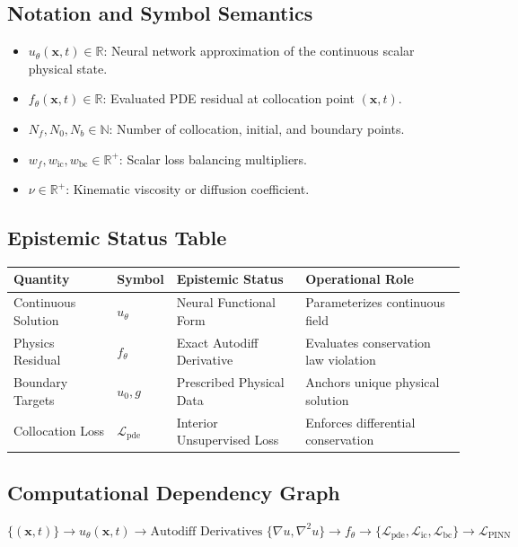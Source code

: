 \documentclass[11pt,a4paper]{article}
\theoremstyle{definition}
\begin{document}
\subsection{Notation and Symbol Semantics}
\begin{itemize}
    \item $u_\theta(\mathbf{x}, t) \in \mathbb{R}$: Neural network approximation of the continuous scalar physical state.
    \item $f_\theta(\mathbf{x}, t) \in \mathbb{R}$: Evaluated PDE residual at collocation point $(\mathbf{x}, t)$.
    \item $N_f, N_0, N_b \in \mathbb{N}$: Number of collocation, initial, and boundary points.
    \item $w_f, w_{\text{ic}}, w_{\text{bc}} \in \mathbb{R}^+$: Scalar loss balancing multipliers.
    \item $\nu \in \mathbb{R}^+$: Kinematic viscosity or diffusion coefficient.
\end{itemize}

\subsection{Epistemic Status Table}
\begin{table}[h]
\centering
\small
\begin{tabular}{@{}llll@{}}
\toprule
\textbf{Quantity} & \textbf{Symbol} & \textbf{Epistemic Status} & \textbf{Operational Role} \\
\midrule
Continuous Solution & $u_\theta$ & Neural Functional Form & Parameterizes continuous field \\
Physics Residual & $f_\theta$ & Exact Autodiff Derivative & Evaluates conservation law violation \\
Boundary Targets & $u_0, g$ & Prescribed Physical Data & Anchors unique physical solution \\
Collocation Loss & $\mathcal{L}_{\text{pde}}$ & Interior Unsupervised Loss & Enforces differential conservation \\
\bottomrule
\end{tabular}
\end{table}

\subsection{Computational Dependency Graph}
{\centering
$\{(\mathbf{x}, t)\} \longrightarrow u_\theta(\mathbf{x}, t) \longrightarrow \text{Autodiff Derivatives } \{\nabla u, \nabla^2 u\} \longrightarrow f_\theta \longrightarrow \{\mathcal{L}_{\text{pde}}, \mathcal{L}_{\text{ic}}, \mathcal{L}_{\text{bc}}\} \longrightarrow \mathcal{L}_{\text{PINN}}$
\par}
\end{document}
